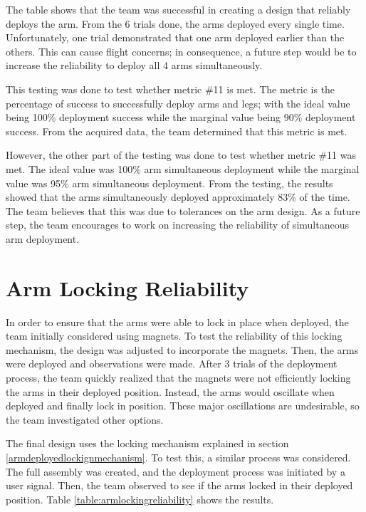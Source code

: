 The table shows that the team was successful in creating a design that reliably deploys the arm. From the 6 trials done, the arms deployed every single time. Unfortunately, one trial demonstrated that one arm deployed earlier than the others. This can cause flight concerns; in consequence, a future step would be to increase the reliability to deploy all 4 arms simultaneously.

This testing was done to test whether metric \#11 is met. The metric is the percentage of success to successfully deploy arms and legs; with the ideal value being 100\% deployment success while the marginal value being 90\% deployment success. From the acquired data, the team determined that this metric is met.

However, the other part of the testing was done to test whether metric \#11 was met. The ideal value was 100\% arm simultaneous deployment while the marginal value was 95\% arm simultaneous deployment. From the testing, the results showed that the arms simultaneously deployed approximately 83\% of the time. The team believes that this was due to tolerances on the arm design. As a future step, the team encourages to work on increasing the reliability of simultaneous arm deployment.

\section{Arm Locking Reliability}
In order to ensure that the arms were able to lock in place when deployed, the team initially considered using magnets. To test the reliability of this locking mechanism, the design was adjusted to incorporate the magnets. Then, the arms were deployed and observations were made. After 3 trials of the deployment process, the team quickly realized that the magnets were not efficiently locking the arms in their deployed position. Instead, the arms would oscillate when deployed and finally lock in position. These major oscillations are undesirable, so the team investigated other options.

The final design uses the locking mechanism explained in section \ref{armdeployedlockignmechanism}. To test this, a similar process was considered. The full assembly was created, and the deployment process was initiated by a user signal. Then, the team observed to see if the arms locked in their deployed position. Table \ref{table:armlockingreliability} shows the results.

